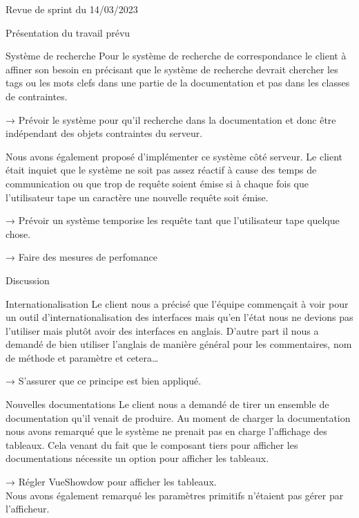 \documentclass[]{article}
\begin{document}
{\begin{section}{Revue de sprint du 14/03/2023}
 \begin{subsection}{Présentation du travail prévu}
     \begin{subsubsection}{Système de recherche}
         Pour le système de recherche de correspondance le client à affiner son besoin en précisant que le système de recherche devrait chercher les tags ou les mots clefs dans une partie de la documentation et pas dans les classes de contraintes.

         → Prévoir le système pour qu’il recherche dans la documentation et donc être indépendant des objets contraintes du serveur.

         Nous avons également proposé d’implémenter ce système côté serveur. Le client était inquiet que le système ne soit pas assez réactif à cause des temps de communication ou que trop de requête soient émise si à chaque fois que l’utilisateur tape un caractère une nouvelle requête soit émise.

         → Prévoir un système temporise les requête tant que l’utilisateur tape quelque chose.

         → Faire des mesures de perfomance
     \end{subsubsection}
 \end{subsection}

 \begin{subsection}{Discussion}
     \begin{subsubsection}{Internationalisation}
         Le client nous a précisé que l’équipe commençait à voir pour un outil d’internationalisation des interfaces mais qu’en l’état nous ne devions pas l’utiliser mais plutôt avoir des interfaces en anglais. D’autre part il nous a demandé de bien utiliser l’anglais de manière général pour les commentaires, nom de méthode et paramètre et cetera…

         → S’assurer que ce principe est bien appliqué.
     \end{subsubsection}

     \begin{subsubsection}{Nouvelles documentations}
         Le client nous a demandé de tirer un ensemble de documentation qu’il venait de produire. Au moment de charger la documentation nous avons remarqué que le système ne prenait pas en charge l’affichage des tableaux. Cela venant du fait que le composant tiers pour afficher les documentations nécessite un option pour afficher les tableaux.

         → Régler VueShowdow pour afficher les tableaux.
         \\[5mm]
         Nous avons également remarqué les paramètres primitifs n’étaient pas gérer par l’afficheur.


\end{subsubsection}
\end{subsection}
\end{section}}
\end{document}
